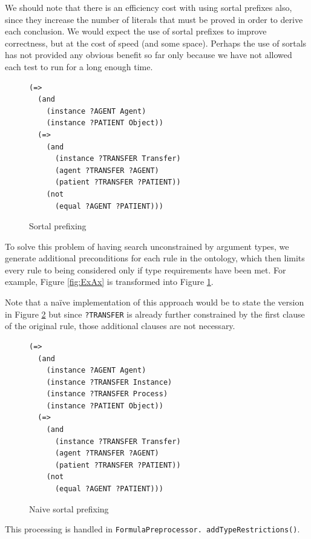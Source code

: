 \documentclass{book}
\begin{document}
We should note that there is an efficiency cost with using sortal prefixes also,
since they increase the number of literals that must be proved in order to
derive each conclusion.  We would expect the use of sortal prefixes to improve
correctness, but at the cost of speed (and some space).  Perhaps the use of
sortals has not provided any obvious benefit so far only because we have not
allowed each test to run for a long enough time.

\begin{figure}
\begin{framed}
\begin{verbatim}
(=>
  (and
    (instance ?AGENT Agent)
    (instance ?PATIENT Object))
  (=>
    (and
      (instance ?TRANSFER Transfer)
      (agent ?TRANSFER ?AGENT)
      (patient ?TRANSFER ?PATIENT))
    (not
      (equal ?AGENT ?PATIENT)))
\end{verbatim}
\caption{Sortal prefixing}
\label{fig:SortPref}
\end{framed}
\end{figure}

To solve this problem of having search unconstrained by argument types, we
generate additional preconditions for each rule in the ontology, which then
limits every rule to being considered only if type requirements have been met.
For example, Figure \ref{fig:ExAx} is transformed into Figure
\ref{fig:SortPref}.

Note that a naïve implementation of this approach would be to state the version
in Figure \ref{fig:NaiveSort} but since {\tt ?TRANSFER} is already further
constrained by the first clause of the original rule, those additional clauses
are not necessary.

\begin{figure}
\begin{framed}
\begin{verbatim}
(=>
  (and
    (instance ?AGENT Agent)
    (instance ?TRANSFER Instance)
    (instance ?TRANSFER Process)
    (instance ?PATIENT Object))
  (=>
    (and
      (instance ?TRANSFER Transfer)
      (agent ?TRANSFER ?AGENT)
      (patient ?TRANSFER ?PATIENT))
    (not
      (equal ?AGENT ?PATIENT)))
\end{verbatim}
\caption{Naive sortal prefixing}
\label{fig:NaiveSort}
\end{framed}
\end{figure}

\begin{sloppypar}
This processing is handled in
\texttt{FormulaPreprocessor. addTypeRestrictions()}.
\end{sloppypar}
\end{document}
